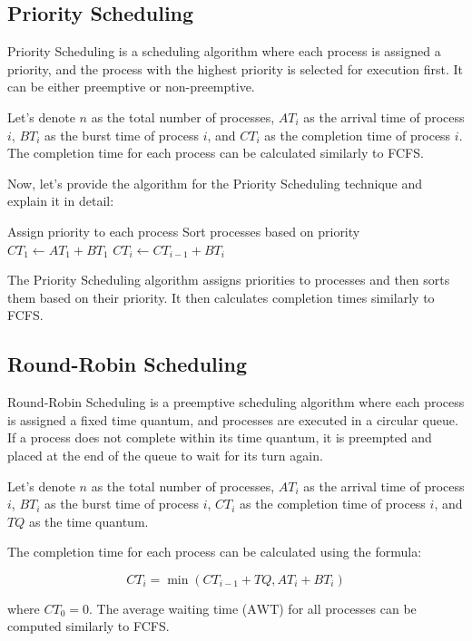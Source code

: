 \documentclass[12pt]{book} %
\begin{document}
\subsection{Priority Scheduling}

Priority Scheduling is a scheduling algorithm where each process is assigned a priority, and the process with the highest priority is selected for execution first. It can be either preemptive or non-preemptive.

Let's denote $n$ as the total number of processes, $AT_i$ as the arrival time of process $i$, $BT_i$ as the burst time of process $i$, and $CT_i$ as the completion time of process $i$. The completion time for each process can be calculated similarly to FCFS.

Now, let's provide the algorithm for the Priority Scheduling technique and explain it in detail:
\FloatBarrier
\begin{algorithm}[H]
\caption{Priority Scheduling}
\begin{algorithmic}[1]
\State Assign priority to each process
\State Sort processes based on priority
\State $CT_1 \gets AT_1 + BT_1$
    \State $CT_i \gets CT_{i-1} + BT_i$
\EndFor
\end{algorithmic}
\end{algorithm}
\FloatBarrier
The Priority Scheduling algorithm assigns priorities to processes and then sorts them based on their priority. It then calculates completion times similarly to FCFS.

\subsection{Round-Robin Scheduling}

Round-Robin Scheduling is a preemptive scheduling algorithm where each process is assigned a fixed time quantum, and processes are executed in a circular queue. If a process does not complete within its time quantum, it is preempted and placed at the end of the queue to wait for its turn again.

Let's denote $n$ as the total number of processes, $AT_i$ as the arrival time of process $i$, $BT_i$ as the burst time of process $i$, $CT_i$ as the completion time of process $i$, and $TQ$ as the time quantum.

The completion time for each process can be calculated using the formula:

\[
CT_i = \min(CT_{i-1} + TQ, AT_i + BT_i)
\]

where $CT_0 = 0$. The average waiting time ($\text{AWT}$) for all processes can be computed similarly to FCFS.
\end{document}
